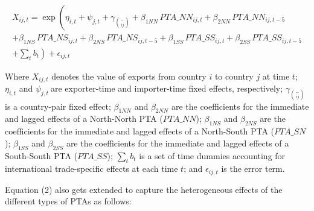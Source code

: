 \begin{multline}
    X_{ij,t} = \exp\left(\eta_{i,t} + \psi_{j,t} + \gamma_{\binom{-}{ij}} + \beta_{1NN} \, PTA\_NN_{ij,t} + \beta_{2NN} \, PTA\_NN_{ij,t-5} \right. \\
    + \beta_{1NS} \, PTA\_NS_{ij,t} + \beta_{2NS} \, PTA\_NS_{ij,t-5} + \beta_{1SS} \, PTA\_SS_{ij,t} + \beta_{2SS} \, PTA\_SS_{ij,t-5} \\
    + \left. \sum_{t} b_{t} \right) + \epsilon_{ij,t}
\end{multline}

Where \(X_{ij,t}\)\hspace{0pt} denotes the value of exports from country
\(i\) to country \(j\) at time \(t\); \(\eta_{i,t}\) and
\(\psi_{j,t}\ \)are exporter-time and importer-time fixed effects,
respectively; \(\gamma_{\binom{-}{ij}}\) is a country-pair fixed effect;
\hspace{0pt}\(\beta_{1NN}\) and \(\beta_{2NN}\) are the coefficients for
the immediate and lagged effects of a North-North PTA (\(PTA\_ NN\));
\hspace{0pt}\hspace{0pt}\(\beta_{1NS}\) and \(\beta_{2NS}\) are the
coefficients for the immediate and lagged effects of a North-South PTA
(\(PTA\_ SN\)); \hspace{0pt}\hspace{0pt}\(\beta_{1SS}\) and
\(\beta_{2SS}\) are the coefficients for the immediate and lagged
effects of a South-South PTA (\(PTA\_ SS\)); \(\sum_{t}^{}b_{t}\) is a
set of time dummies accounting for international trade-specific effects
at each time \(t\); and \(\epsilon_{ij,t}\) is the error term.

Equation (2) also gets extended to capture the heterogeneous effects of
the different types of PTAs as follows:


